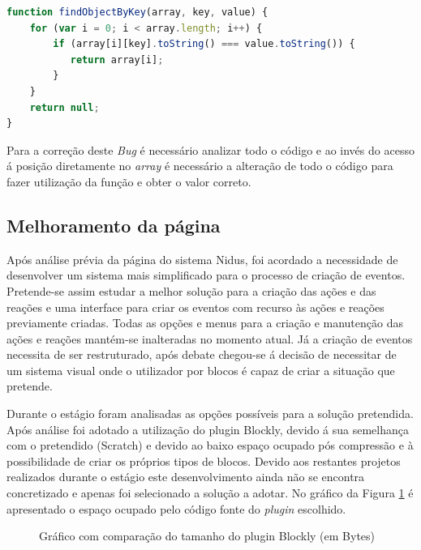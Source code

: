 \begin{lstlisting}[caption=Função findObjectByKey,label={js2},language=JavaScript]
function findObjectByKey(array, key, value) {
    for (var i = 0; i < array.length; i++) {
        if (array[i][key].toString() === value.toString()) {
           return array[i];
        }
    }
    return null;
}
\end{lstlisting}

\par Para a correção deste \textit{Bug} é necessário analizar todo o código e ao invés do acesso á posição diretamente no \textit{array} é necessário a alteração de todo o código para fazer utilização da função e obter o valor correto.


\subsection{Melhoramento da página}
\par Após análise prévia da página do sistema Nidus, foi acordado a necessidade de desenvolver um sistema mais simplificado para o processo de criação de eventos. Pretende-se assim estudar a melhor solução para a criação das ações e das reações e uma interface para criar os eventos com recurso às ações e reações previamente criadas. Todas as opções e menus para a criação e manutenção das ações e reações mantém-se inalteradas no momento atual. Já a criação de eventos necessita de ser restruturado, após debate chegou-se á decisão de necessitar de um sistema visual onde o utilizador por blocos é capaz de criar a situação que pretende.
\par Durante o estágio foram analisadas as opções possíveis para a solução pretendida. Após análise foi adotado a utilização do plugin Blockly\cite{blockly}, devido á sua semelhança com o pretendido (Scratch) e devido ao baixo espaço ocupado pós compressão e à possibilidade de criar os próprios tipos de blocos. Devido aos restantes projetos realizados durante o estágio este desenvolvimento ainda não se encontra concretizado e apenas foi selecionado a solução a adotar. No gráfico da Figura \ref{block} é apresentado o espaço ocupado pelo código fonte do \textit{plugin} escolhido.


\begin{figure}[ht]
\centering
{}

\caption{Gráfico com comparação do tamanho do plugin Blockly (em Bytes)}\label{block}


\end{figure}



